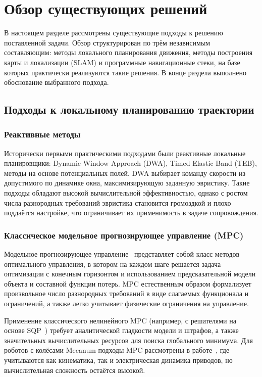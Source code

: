 \section{Обзор существующих решений}
\label{sec:review}

В настоящем разделе рассмотрены существующие подходы к решению
поставленной задачи. Обзор структурирован по трём независимым
составляющим: методы локального планирования движения, методы
построения карты и локализации (SLAM) и программные навигационные
стеки, на базе которых практически реализуются такие решения. В конце
раздела выполнено обоснование выбранного подхода.

\subsection{Подходы к локальному планированию траектории}

\subsubsection{Реактивные методы}

Исторически первыми практическими подходами были реактивные локальные
планировщики: Dynamic Window Approach (DWA), Timed Elastic Band (TEB),
методы на основе потенциальных полей. DWA выбирает команду скорости из
допустимого по динамике окна, максимизирующую заданную эвристику. Такие подходы обладают
высокой вычислительной эффективностью, однако с ростом числа разнородных
требований эвристика становится громоздкой и плохо поддаётся настройке,
что ограничивает их применимость в задаче сопровождения.

\subsubsection{Классическое модельное прогнозирующее управление (MPC)}

Модельное прогнозирующее управление~\cite{Alkhaddad2023MPC} представляет
собой класс методов оптимального управления, в котором на каждом шаге
решается задача оптимизации с конечным горизонтом и использованием
предсказательной модели объекта и составной функции потерь. MPC
естественным образом формализует произвольное число разнородных
требований в виде слагаемых функционала и ограничений, а также легко
учитывает физические ограничения на управление.

Применение классического нелинейного MPC (например, с решателями на
основе SQP~\cite{Alkhaddad2023MPC}) требует аналитической гладкости
модели и штрафов, а также значительных вычислительных ресурсов для
поиска глобального минимума. Для роботов с колёсами Mecanum подходы
MPC рассмотрены в работе~\cite{MorenoCaireta2020MPC}, где учитываются
как кинематика, так и электрическая динамика приводов, но вычислительная
сложность остаётся высокой.

